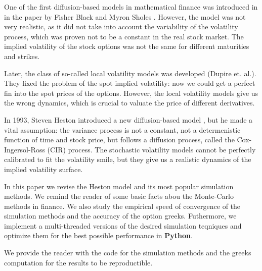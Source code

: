 One of the first diffusion-based models in mathematical finance was introduced in 
\citeyear{BlackSholes1973} in the paper by Fisher Black and Myron Sholes \cite{BlackSholes1973}. 
However, the model was not very realistic, as it did not take into account the variability of
the volatility process, which was proven not to be a constant in the real stock market.
The implied volatility of the stock options was not the same for different maturities and
strikes.

Later, the class of so-called local volatility models was developed (Dupire et. al.). They
fixed the problem of the spot implied volatility: now we could get a perfect fin into the spot 
prices of the options. However, the local volatility models give us the wrong dynamics,
which is crucial to valuate the price of different derivatives.

In 1993, Steven Heston introduced a new diffusion-based model \cite{Heston1993}, but he made a 
vital assumption: the variance process is not a constant, not a determenistic function of time and 
stock price, but follows a diffusion process, called the Cox-Ingersol-Ross (CIR) process. The 
stochastic volatility models cannot be perfectly calibrated to fit the volatility smile, but
they give us a realistic dynamics of the implied volatility surface.

In this paper we revise the Heston model and its most popular simulation methods. We remind
the reader of some basic facts abou the Monte-Carlo methods in finance. We also study the 
empirical speed of convergence of the simulation methods and the accuracy of the option 
greeks. Futhermore, we implement a multi-threaded versions of the desired simulation teqniques 
and optimize them for the best possible performance in \textbf{Python}.

We provide the reader with the code for the simulation methods and the greeks computation for the 
results to be reproductible.